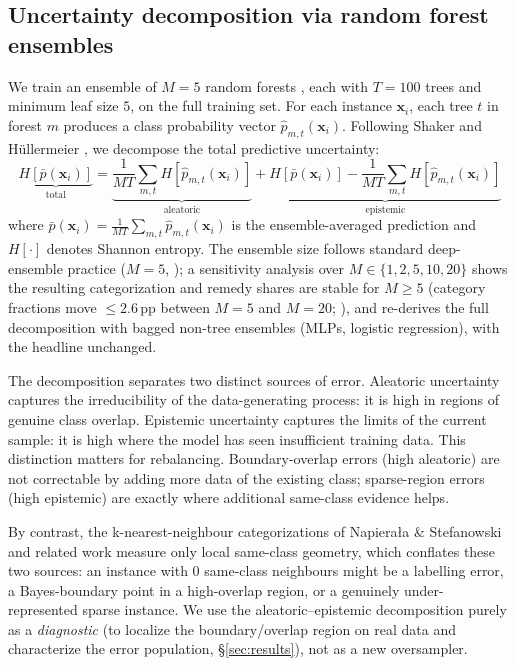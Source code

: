 \subsection{Uncertainty decomposition via random forest ensembles}\label{sec:method:uncert}

We train an ensemble of $M=5$ random forests \cite{breiman2001random}, each with
$T=100$ trees and minimum leaf size $5$, on the full training set. For each
instance $\mathbf{x}_i$, each tree $t$ in forest $m$ produces a class probability
vector $\hat{p}_{m,t}(\mathbf{x}_i)$. Following Shaker and H\"ullermeier
\cite{shaker2020aleatoric,hullermeier2021aleatoric}, we decompose the total
predictive uncertainty:
\begin{equation}
\underbrace{H[\bar{p}(\mathbf{x}_i)]}_{\text{total}}
= \underbrace{\frac{1}{MT}\sum_{m,t} H[\hat{p}_{m,t}(\mathbf{x}_i)]}_{\text{aleatoric}}
+ \underbrace{H[\bar{p}(\mathbf{x}_i)] - \frac{1}{MT}\sum_{m,t} H[\hat{p}_{m,t}(\mathbf{x}_i)]}_{\text{epistemic}}
\label{eq:uncertainty}
\end{equation}
where $\bar{p}(\mathbf{x}_i) = \frac{1}{MT}\sum_{m,t}\hat{p}_{m,t}(\mathbf{x}_i)$
is the ensemble-averaged prediction and $H[\cdot]$ denotes Shannon entropy.
The ensemble size follows standard deep-ensemble practice ($M{=}5$,
\cite{lakshminarayanan2017simple}); a sensitivity analysis over
$M \in \{1,2,5,10,20\}$ shows the resulting categorization and remedy shares
are stable for $M \ge 5$ (category fractions move $\le 2.6$\,pp between $M{=}5$
and $M{=}20$; ), and 
re-derives the full decomposition with bagged non-tree ensembles (MLPs,
logistic regression), with the headline unchanged.

The decomposition separates two distinct sources of error. Aleatoric uncertainty
captures the irreducibility of the data-generating process: it is high in regions
of genuine class overlap. Epistemic uncertainty captures the limits of the current
sample: it is high where the model has seen insufficient training data. This
distinction matters for rebalancing. Boundary-overlap errors (high aleatoric) are
not correctable by adding more data of the existing class; sparse-region errors
(high epistemic) are exactly where additional same-class evidence helps.

By contrast, the k-nearest-neighbour categorizations of Napiera{\l}a \&
Stefanowski \cite{napierala2016types} and related work \cite{smith2014instance}
measure only local same-class geometry, which conflates these two sources: an
instance with $0$ same-class neighbours might be a labelling error, a
Bayes-boundary point in a high-overlap region, or a genuinely under-represented
sparse instance. We use the aleatoric--epistemic decomposition purely as a
\emph{diagnostic} (to localize the boundary/overlap region on real data and
characterize the error population, \S\ref{sec:results}), not as a new
oversampler.

